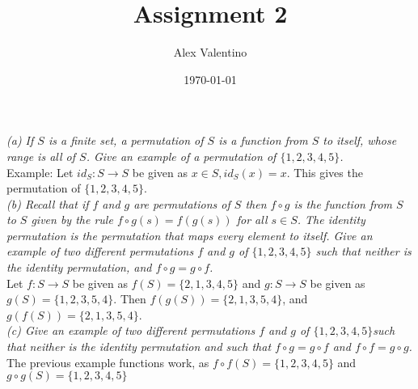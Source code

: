\documentclass[12pt, letterpaper]{article}
\date{\today}
\author{Alex Valentino}
\title{Assignment 2}
\begin{document}
	\textit{(a) If $S$ is a finite set, a permutation of $S$ is a function from $S$ to itself, whose range is all
of $S$. Give an example of a permutation of $\{1, 2, 3, 4, 5\}$.}\\
	Example: Let $id_S: S \to S$ be given as $x \in S, id_S(x) = x.$  This gives the permutation of $\{1,2,3,4,5\}$.\\
	\textit{(b) Recall that if $f$ and $g$ are permutations of $S$ then $f\circ g$ is the function from $S$ to $S$ given
by the rule $f \circ g(s) = f (g(s))$ for all $s \in S$. The identity permutation is the permutation
that maps every element to itself. Give an example of two different permutations $f$ and
$g$ of $\{1, 2, 3, 4, 5\}$ such that neither is the identity permutation, and $f\circ g = g \circ f$.} \\
Let $f : S \to S$ be given as $f(S) = \{2,1,3,4,5\}$ and $g : S \to S$ be given as $g(S) = \{1,2,3,5,4\}$.  Then $f(g(S)) = \{2,1,3,5,4\}$, and $g(f(S)) = \{2,1,3,5,4\}$.\\
	\textit{(c) Give an example of two different permutations $f$ and $g$ of $\{1, 2, 3, 4, 5\}$such that neither
is the identity permutation and such that $f \circ g = g \circ f$ and $f \circ f = g \circ g$.}\\
	The previous example functions work, as $f \circ f (S) = \{1,2,3,4,5\}$ and $g \circ g (S) = \{1,2,3,4,5\}$  
	
\end{document}

